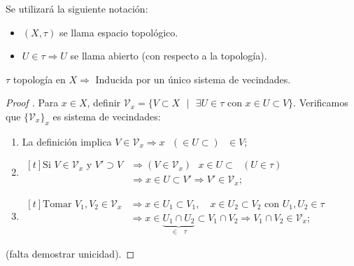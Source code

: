 \begin{remark}
	Se utilizará la siguiente notación:
	\begin{itemize}
		\item $(X,\tau)$ se llama espacio topológico.

		\item $U \in \tau \Rightarrow U$ se llama abierto (con respecto a la topología).
	\end{itemize}
\end{remark}

\begin{lemma}
	$\tau$ topología en $X \Rightarrow$ Inducida por un único sistema de vecindades.
\end{lemma}

\begin{proof}[Proof ]
	Para $x \in X$, definir $\mathcal{V}_x = \{ V \subset X \text{ } | \text{ } \exists U \in \tau \text{ con } x \in U \subset V \}$. Verificamos que $\{ \mathcal{V}_x \}_x$ es sistema de vecindades:

	\begin{enumerate}
		\item La definición implica $V \in \mathcal{V}_x \Rightarrow x \text{ } (\in U \subset) \text{ } \in V$;

		\item $\begin{aligned}[t]
			\text{Si } V \in \mathcal{V}_x \text{ y } V' \supset V & \Rightarrow (V \in \mathcal{V}_x) \text{ } x \in U \subset \text{ } (U \in \tau) \\
			& \Rightarrow x \in U \subset V' \Rightarrow V' \in \mathcal{V}_x;
		\end{aligned}$

		\item $\begin{aligned}[t]
			\text{Tomar } V_1,V_2 \in \mathcal{V}_x & \Rightarrow x \in U_1 \subset V_1, \quad x \in U_2 \subset V_2 \text{ con } U_1,U_2 \in \tau \\
			& \Rightarrow x \in \underbrace{U_1 \cap U_2}_{\in \text{ } \tau} \subset V_1 \cap V_2 \Rightarrow V_1 \cap V_2 \in \mathcal{V}_x;
		\end{aligned}$
	\end{enumerate}

	(falta demostrar unicidad).
\end{proof}

